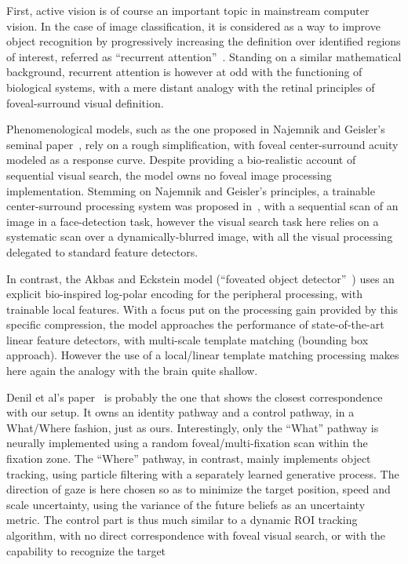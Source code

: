 First, active vision is of course an important topic in mainstream computer vision. In the case of image classification, it is considered as a way to improve object recognition by progressively increasing the definition over identified regions of interest, referred as ``recurrent attention''~\cite{mnih2014recurrent,fu2017look}.
Standing on a similar mathematical background, recurrent attention is however at odd with the functioning of biological systems, with a mere distant analogy with the retinal principles of foveal-surround visual definition.

Phenomenological models, such as the one proposed in Najemnik and Geisler's seminal paper~\cite{Najemnik05}, rely on a rough simplification, with foveal center-surround acuity modeled as a response curve. Despite providing a bio-realistic account of sequential visual search, the model owns no foveal image processing implementation. Stemming on Najemnik and Geisler's principles, a trainable center-surround processing system was proposed in~\cite{Butko2010infomax}, with a sequential scan of an image in a face-detection task, however the visual search task here relies on a systematic scan over a  dynamically-blurred image, with all the visual processing delegated to standard feature detectors.

In contrast, the Akbas and Eckstein model (“foveated object detector”~\cite{akbas2017object}) uses an explicit bio-inspired log-polar encoding
for the peripheral processing, with trainable local features.
With a focus put on the processing gain provided by this specific compression,
the model approaches the performance of state-of-the-art linear feature detectors, with  multi-scale template matching (bounding box approach). However the use of
a local/linear template matching processing makes here again the analogy with the brain quite shallow.


Denil et al's paper~\cite{denil2012learning} is probably the one that shows the closest correspondence with our setup. It owns an identity pathway and a control pathway, in a What/Where fashion, just as ours. Interestingly, only the ``What'' pathway is neurally implemented using a random foveal/multi-fixation scan within the fixation zone. The ``Where'' pathway, in contrast, mainly implements object tracking, using  particle filtering with a separately learned generative process. The direction of gaze is here chosen so as to minimize the target position, speed and scale uncertainty, using the variance of the future beliefs as an uncertainty metric. The control part is thus much similar to a dynamic ROI tracking algorithm, with no direct correspondence with foveal visual search, or with the capability to recognize the target

